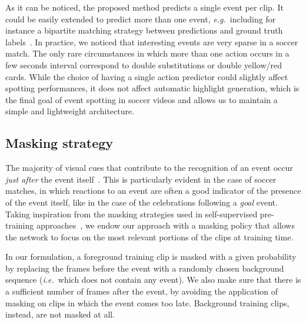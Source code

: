 \documentclass[a4paper,conference]{IEEEtran}
\def \ie {\emph{i.e.}}
\def \eg {\emph{e.g.}}
\begin{document}
As it can be noticed, the proposed method predicts a single event per clip. It could be easily extended to predict more than one event, \eg~including for instance a bipartite matching strategy between predictions and ground truth labels~\cite{carion2020end}. In practice, we noticed that interesting events are very sparse in a soccer match. The only rare circumstances in which more than one action occurs in a few seconds interval correspond to  double substitutions or double yellow/red cards. While the choice of having a single action predictor could slightly affect spotting performances, it does not affect automatic highlight generation, which is the final goal of event spotting in soccer videos and allows us to maintain a simple and lightweight architecture.

\subsection{Masking strategy}

The majority of visual cues that contribute to the recognition of an event occur \textit{just after} the event itself~\cite{cioppa2020context}. This is particularly evident in the case of soccer matches, in which reactions to an event are often a good indicator of the presence of the event itself, like in the case of the celebrations following a \textit{goal} event. Taking inspiration from the masking strategies used in self-supervised pre-training approaches~\cite{devlin2018bert}, we endow our approach with a masking policy that allows the network to focus on the most relevant portions of the clips at training time.

In our formulation, a foreground training clip is masked with a given probability by replacing the frames before the event with a randomly chosen background sequence (\ie~which does not contain any event). We also make sure that there is a sufficient number of frames after the event, by avoiding the application of masking on clips in which the event comes too late. Background training clips, instead, are not masked at all.
\end{document}
